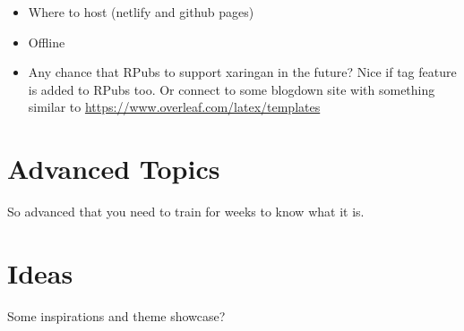 \documentclass[
]{book}
\providecommand{\tightlist}{%
  \setlength{\itemsep}{0pt}\setlength{\parskip}{0pt}}
\begin{document}
\begin{itemize}
\tightlist
\item
  Where to host (netlify and github pages)
\item
  Offline
\item
  Any chance that RPubs to support xaringan in the future? Nice if tag feature is added to RPubs too. Or connect to some blogdown site with something similar to \url{https://www.overleaf.com/latex/templates}
\end{itemize}

\hypertarget{advanced}{%
\chapter{Advanced Topics}\label{advanced}}

So advanced that you need to train for weeks to know what it is.

\hypertarget{ideas}{%
\chapter{Ideas}\label{ideas}}

Some inspirations and theme showcase?

  

\backmatter
\printindex
\end{document}
